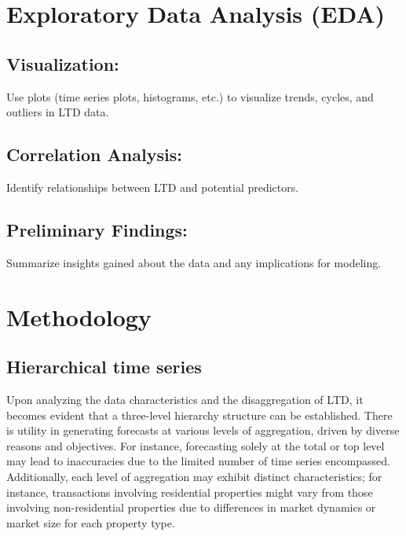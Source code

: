 \documentclass[11pt,a4paper,]{article}
\begin{document}
\section{Exploratory Data Analysis (EDA)}\label{exploratory-data-analysis-eda}

\subsection{Visualization:}\label{visualization}

Use plots (time series plots, histograms, etc.) to visualize trends, cycles, and outliers in LTD data.

\subsection{Correlation Analysis:}\label{correlation-analysis}

Identify relationships between LTD and potential predictors.

\subsection{Preliminary Findings:}\label{preliminary-findings}

Summarize insights gained about the data and any implications for modeling.

\section{Methodology}\label{methodology}

\subsection{Hierarchical time series}\label{hierarchical-time-series}

Upon analyzing the data characteristics and the disaggregation of LTD, it becomes evident that a three-level hierarchy structure can be established. There is utility in generating forecasts at various levels of aggregation, driven by diverse reasons and objectives. For instance, forecasting solely at the total or top level may lead to inaccuracies due to the limited number of time series encompassed. Additionally, each level of aggregation may exhibit distinct characteristics; for instance, transactions involving residential properties might vary from those involving non-residential properties due to differences in market dynamics or market size for each property type.
\end{document}

